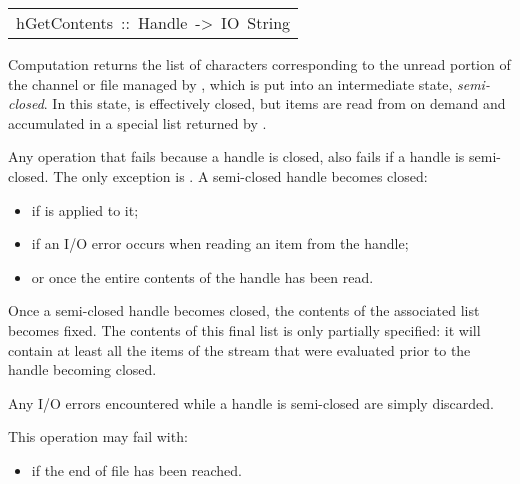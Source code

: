 \begin{haddockdesc}
\item[\begin{tabular}{@{}l}
hGetContents\ ::\ Handle\ ->\ IO\ String
\end{tabular}]\haddockbegindoc
Computation   returns the list of characters
 corresponding to the unread portion of the channel or file managed
 by , which is put into an intermediate state, \emph{semi-closed}.
 In this state,  is effectively closed,
 but items are read from  on demand and accumulated in a special
 list returned by  .
\par
Any operation that fails because a handle is closed,
 also fails if a handle is semi-closed.  The only exception is .
 A semi-closed handle becomes closed:
\par
\begin{itemize}
\item
 if  is applied to it;
\par

\item
 if an I/O error occurs when reading an item from the handle;
\par

\item
 or once the entire contents of the handle has been read.
\par

\end{itemize}
Once a semi-closed handle becomes closed, the contents of the
 associated list becomes fixed.  The contents of this final list is
 only partially specified: it will contain at least all the items of
 the stream that were evaluated prior to the handle becoming closed.
\par
Any I/O errors encountered while a handle is semi-closed are simply
 discarded.
\par
This operation may fail with:
\par
\begin{itemize}
\item
  if the end of file has been reached.
\par

\end{itemize}

\end{haddockdesc}

